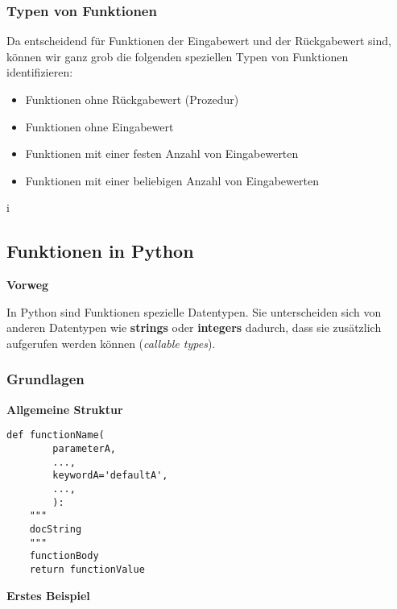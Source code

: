 \subsubsection{\texorpdfstring{{Typen von
Funktionen}}{Typen von Funktionen}}

Da entscheidend für Funktionen der Eingabewert und der Rückgabewert
sind, können wir ganz grob die folgenden speziellen Typen von Funktionen
identifizieren:

\begin{itemize}
\itemsep1pt\parskip0pt
\item
  {Funktionen ohne Rückgabewert (Prozedur)}
\item
  {Funktionen ohne Eingabewert}
\item
  {Funktionen mit einer festen Anzahl von Eingabewerten}
\item
  {Funktionen mit einer beliebigen Anzahl von Eingabewerten}
\end{itemize}
i
\subsection{Funktionen in Python}


\vspace{0.5cm}\par\noindent\textbf{Vorweg}\vspace{0.5cm}

In Python sind Funktionen spezielle Datentypen. Sie unterscheiden sich
von anderen Datentypen wie \textbf{strings} oder \textbf{integers}
dadurch, dass sie zusätzlich aufgerufen werden können (\emph{callable
types}).



\subsubsection{Grundlagen}

\vspace{0.5cm}\par\noindent\textbf{Allgemeine Struktur}\vspace{0.5cm}

\begin{verbatim}
def functionName(
        parameterA,
        ...,
        keywordA='defaultA',
        ...,
        ):
    """
    docString
    """
    functionBody
    return functionValue
\end{verbatim}




\vspace{0.5cm}\par\noindent\textbf{Erstes Beispiel}\vspace{0.5cm}

